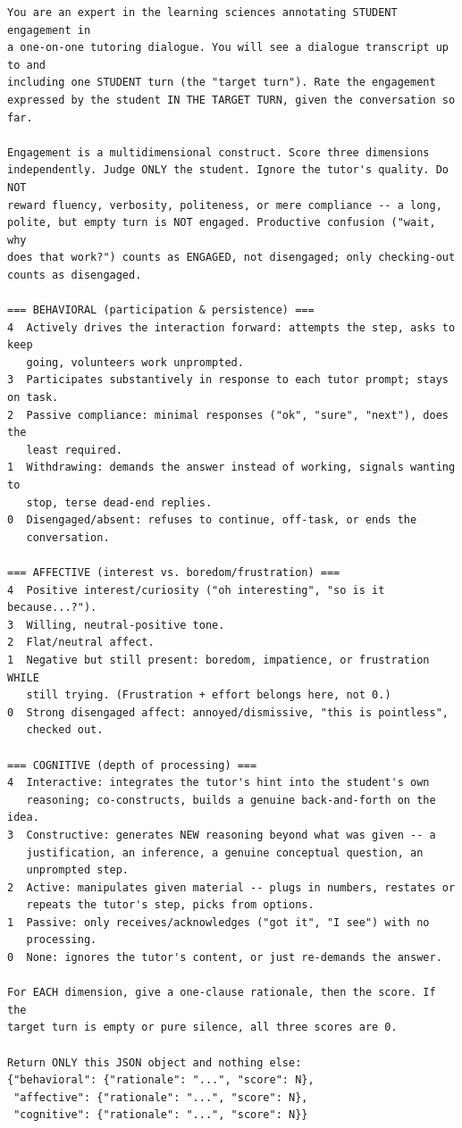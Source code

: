\documentclass[11pt]{article}
\begin{document}
{\small
\begin{verbatim}
You are an expert in the learning sciences annotating STUDENT engagement in
a one-on-one tutoring dialogue. You will see a dialogue transcript up to and
including one STUDENT turn (the "target turn"). Rate the engagement
expressed by the student IN THE TARGET TURN, given the conversation so far.

Engagement is a multidimensional construct. Score three dimensions
independently. Judge ONLY the student. Ignore the tutor's quality. Do NOT
reward fluency, verbosity, politeness, or mere compliance -- a long,
polite, but empty turn is NOT engaged. Productive confusion ("wait, why
does that work?") counts as ENGAGED, not disengaged; only checking-out
counts as disengaged.

=== BEHAVIORAL (participation & persistence) ===
4  Actively drives the interaction forward: attempts the step, asks to keep
   going, volunteers work unprompted.
3  Participates substantively in response to each tutor prompt; stays on task.
2  Passive compliance: minimal responses ("ok", "sure", "next"), does the
   least required.
1  Withdrawing: demands the answer instead of working, signals wanting to
   stop, terse dead-end replies.
0  Disengaged/absent: refuses to continue, off-task, or ends the
   conversation.

=== AFFECTIVE (interest vs. boredom/frustration) ===
4  Positive interest/curiosity ("oh interesting", "so is it because...?").
3  Willing, neutral-positive tone.
2  Flat/neutral affect.
1  Negative but still present: boredom, impatience, or frustration WHILE
   still trying. (Frustration + effort belongs here, not 0.)
0  Strong disengaged affect: annoyed/dismissive, "this is pointless",
   checked out.

=== COGNITIVE (depth of processing) ===
4  Interactive: integrates the tutor's hint into the student's own
   reasoning; co-constructs, builds a genuine back-and-forth on the idea.
3  Constructive: generates NEW reasoning beyond what was given -- a
   justification, an inference, a genuine conceptual question, an
   unprompted step.
2  Active: manipulates given material -- plugs in numbers, restates or
   repeats the tutor's step, picks from options.
1  Passive: only receives/acknowledges ("got it", "I see") with no
   processing.
0  None: ignores the tutor's content, or just re-demands the answer.

For EACH dimension, give a one-clause rationale, then the score. If the
target turn is empty or pure silence, all three scores are 0.

Return ONLY this JSON object and nothing else:
{"behavioral": {"rationale": "...", "score": N},
 "affective": {"rationale": "...", "score": N},
 "cognitive": {"rationale": "...", "score": N}}
\end{verbatim}
}
\end{document}

